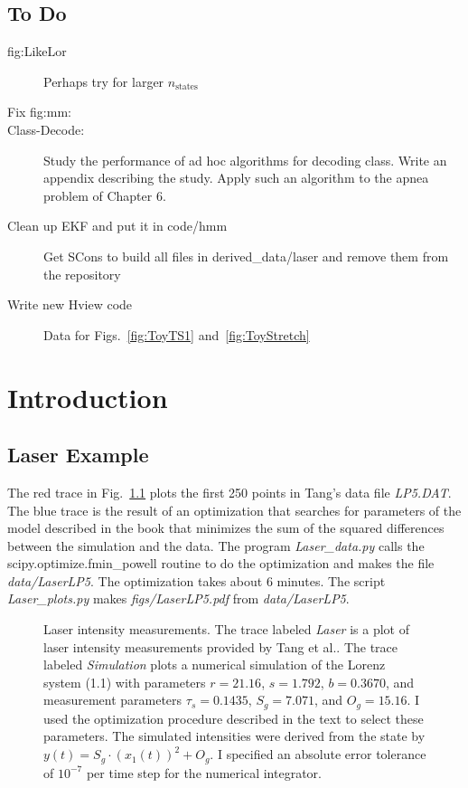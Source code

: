 \documentclass[prelim,showlabels]{book}
\newcommand{\Tsamp}{\tau_s }
\newcommand{\ti}[2]{{#1}{(#2)}}                  %
\newcommand{\etal}{et al.\xspace}
\begin{document}
\section*{To Do}
\begin{description}
\item[fig:LikeLor] Perhaps try for larger $n_\text{states}$
\item[Fix fig:mm:]
\item[Class-Decode:] Study the performance of ad hoc algorithms for
  decoding class.  Write an appendix describing the study.  Apply such
  an algorithm to the apnea problem of Chapter 6.
\item[Clean up EKF and put it in code/hmm]  Get SCons to build all
  files in derived\_data/laser and remove them from the repository
\item[Write new Hview code] Data for Figs.~\ref{fig:ToyTS1}
  and~\ref{fig:ToyStretch}

\end{description}

\mainmatter
\chapter{Introduction}
\label{chap:introduction}

\section{Laser Example}

The red trace in Fig.~\ref{fig:LaserLP5} plots the first 250 points in
Tang's data file \emph{LP5.DAT}.  The blue trace is the result of an
optimization that searches for parameters of the model described in
the book that minimizes the sum of the squared differences between the
simulation and the data.  The program \emph{Laser\_data.py} calls the
scipy.optimize.fmin\_powell routine to do the optimization and makes
the file \emph{data/LaserLP5}.  The optimization takes about 6
minutes.  The script \emph{Laser\_plots.py} makes
\emph{figs/LaserLP5.pdf} from \emph{data/LaserLP5}.
\begin{figure}[htbp]
  \caption[Laser intensity measurements.]%
  {Laser intensity measurements.  The trace labeled \emph{Laser} is a
    plot of laser intensity measurements provided by Tang \etal.  The
    trace labeled \emph{Simulation} plots a numerical simulation of
    the Lorenz system (1.1) with parameters $r=21.16$,
    $s=1.792$, $b=0.3670$, and measurement parameters $\Tsamp=0.1435$,
    $S_g = 7.071$, and $O_g =15.16$.  I used the optimization
    procedure described in the text to select these parameters.  The
    simulated intensities were derived from the state by $\ti{y}{t} =
    S_g \cdot (\ti{x_1}{t})^2 + O_g$.  I specified an absolute error
    tolerance of $10^{-7}$ per time step for the numerical
    integrator.}
  \label{fig:LaserLP5}
\end{figure}
\end{document}
